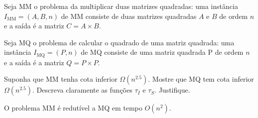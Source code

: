 Seja MM o problema da multiplicar duas matrizes quadradas: uma instância $I_\text{MM} = (A,B,n)$ de MM consiste de duas matrizes quadradas $A$ e $B$ de ordem $n$ e a saída é a matriz $C = A \times B$.

Seja MQ o problema de calcular o quadrado de uma matriz quadrada: uma instância $I_\text{MQ} = (P,n)$ de MQ consiste de uma matriz quadrada P de ordem $n$ e a saída é a matriz $Q = P \times P$.

Suponha que MM tenha cota inferior $\Omega\left(n^{2.5}\right)$. Mostre que MQ tem cota inferior $\Omega\left(n^{2.5}\right)$. Descreva claramente as funções $\tau_I$ e $\tau_S$. Justifique.

\itemdsep

\begin{lemma} \label{lemma:redutivel}
    O problema MM é redutível a MQ em tempo $O\left(n^2\right)$.
\end{lemma}

